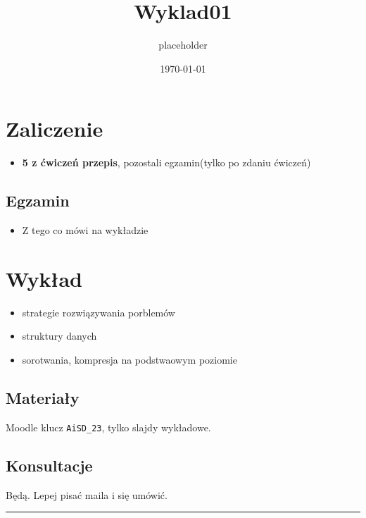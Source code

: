 \documentclass[11pt]{article}
\author{placeholder}
\date{\today}
\title{Wyklad01}
\begin{document}
\maketitle
\tableofcontents

\section{Zaliczenie}
\label{sec:orgaba6485}
\begin{itemize}
\item \textbf{5 z ćwiczeń przepis}, pozostali egzamin(tylko po zdaniu ćwiczeń)
\end{itemize}
\subsection{Egzamin}
\label{sec:org9e01d2e}
\begin{itemize}
\item Z tego co mówi na wykładzie
\end{itemize}
\section{Wykład}
\label{sec:org8d75c0b}
\begin{itemize}
\item strategie rozwiązywania porblemów
\item struktury danych
\item sorotwania, kompresja na podstwaowym poziomie
\end{itemize}
\subsection{Materiały}
\label{sec:orge272da8}
Moodle klucz \texttt{AiSD\_23}, tylko slajdy wykładowe.
\subsection{Konsultacje}
\label{sec:orgafe311a}
Będą. Lepej pisać maila i się umówić.

\noindent\rule{\textwidth}{0.5pt}
\end{document}
